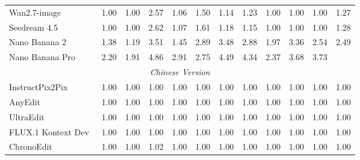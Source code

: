 \begin{table}[t]
{\begin{tabular}{l|cccccccccc|c}
            

            \midrule

            Wan2.7-image~\cite{nanobananapro}
            & 1.00 & 1.00 & 2.57 & 1.06 & 1.50 & 1.14 & 1.23 & 1.00 & 1.00 & 1.00
            & \cellcolor[HTML]{C8C8C8}1.27 \\

            Seedream 4.5~\cite{seedream2025seedream}
            & 1.00 & 1.00 & 2.62 & 1.07 & 1.61 & 1.18 & 1.15 & 1.00 & 1.00 & 1.00
            & \cellcolor[HTML]{C8C8C8}1.28 \\

            Nano Banana 2~\cite{gemini3pro}
            & 1.38 & 1.19 & 3.51 & 1.45 & 2.89 & 3.48 & 2.88 & 1.97 & 3.36 & 2.54
            & \cellcolor[HTML]{C8C8C8}2.49   \\

            
            Nano Banana Pro~\cite{nanobananapro}
            & 2.20 & 1.91 & 4.86 & 2.91 & 2.75 & 4.49 & 4.34 & 2.37 & 3.68 & 3.73
            &\cellcolor[HTML]{C8C8C8}{\color[HTML]{319B62}\textbf{3.35}} \\

            
 

            \midrule
            \multicolumn{12}{c}{\textit{Chinese Version}} \\
            \midrule

            InstructPix2Pix~\cite{brooks2023instructpix2pix}
            & 1.00 & 1.00 & 1.00 & 1.00 & 1.00 & 1.00 & 1.00 & 1.00 & 1.00 & 1.00
            & \cellcolor[HTML]{C8C8C8}1.00 \\


            AnyEdit~\cite{yu2025anyedit}
            & 1.00 & 1.00 & 1.00 & 1.00 & 1.00 & 1.00 & 1.00 & 1.00 & 1.00 & 1.00
            & \cellcolor[HTML]{C8C8C8}1.00 \\

            UltraEdit~\cite{zhao2024ultraedit}
            & 1.00 & 1.00 & 1.00 & 1.00 & 1.00 & 1.00 & 1.00 & 1.00 & 1.00 & 1.00
            & \cellcolor[HTML]{C8C8C8}1.00 \\

            FLUX.1 Kontext Dev~\cite{labs2025flux}
             & 1.00 & 1.00 & 1.00 & 1.00 & 1.00 & 1.00 & 1.00 & 1.00 & 1.00 & 1.00
            & \cellcolor[HTML]{C8C8C8}1.00 \\

            ChronoEdit~\cite{wu2025chronoedit}
            & 1.00 & 1.00 & 1.02 & 1.00 & 1.00 & 1.00 & 1.00 & 1.00 & 1.00 & 1.00
            & \cellcolor[HTML]{C8C8C8}1.00 \\


\end{tabular}}
\end{table}
